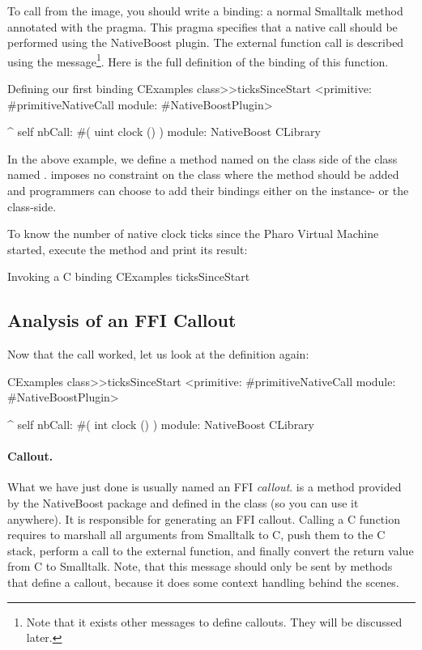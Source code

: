 \documentclass[a4paper,10pt,twoside]{book}
\begin{document}
To call  from the image, you should write a binding: a
normal Smalltalk method annotated with the 
pragma. This pragma specifies that a native call should be performed
using the NativeBoost plugin. The external function call is described
using the  message\footnote{Note that it exists other messages to 
define callouts. They will be discussed later.}. 
Here is the full definition of the binding of this  function. 

\begin{script}{Defining our first binding}
CExamples class>>ticksSinceStart
  <primitive: #primitiveNativeCall module: #NativeBoostPlugin>

  ^ self nbCall: #( uint clock () ) module: NativeBoost CLibrary
\end{script}

In the above example, we define a method named  on the class side of the class named .
\NativeBoost imposes no constraint on the class where the method should be added and programmers can choose to
add their bindings either on the instance- or the class-side.

To know the number of native clock ticks since the Pharo Virtual Machine started, execute the method and print its result:

\begin{script}{Invoking a C binding}
CExamples ticksSinceStart
\end{script}


\subsection{Analysis of an FFI Callout}
Now that the call worked, let us look at the definition again:

\begin{code}{}
CExamples class>>ticksSinceStart
	<primitive: #primitiveNativeCall module: #NativeBoostPlugin>
	
	^ self nbCall: #( int clock () ) module: NativeBoost CLibrary
\end{code}

\paragraph{Callout.}
What we have just done is usually named an FFI \emph{callout}. 
 is a method provided by the NativeBoost package and defined in the  class (so you can use it anywhere). 
It is responsible for generating an FFI callout.
Calling a C function requires to marshall all arguments from Smalltalk to C, push them to the C stack, perform a call to the external function, and finally convert the return value from C to Smalltalk. 
Note, that this message  should only be sent by methods that define a callout, because it does some context handling behind the scenes. 
\end{document}
